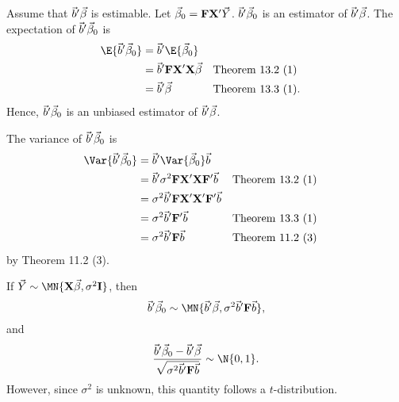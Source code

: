 \begin{Remark}{}{}
    Assume that $ \vec{b}'\vec{\beta} $ is estimable. Let
    $ \vec{\beta}_0=\mathbf{F}\mathbf{X}'\vec{Y} $.
    $ \vec{b}'\vec{\beta}_0 $ is an estimator of $ \vec{b}'\vec{\beta} $.
    \tcblower{}
    The expectation of $ \vec{b}'\vec{\beta}_0 $ is
    \begin{align*}
        \E{\Vector{b}'\Vector{\beta}_0}
         & =\Vector{b}'\E{\Vector{\beta}_0}                                                        \\
         & =\Vector{b}'\Matrix{F}\Matrix{X}'\Matrix{X}\Vector{\beta} &  & \text{Theorem 13.2 (1)}  \\
         & =\Vector{b}'\Vector{\beta}                                &  & \text{Theorem 13.3 (1)}.
    \end{align*}
    Hence, $ \vec{b}'\vec{\beta}_0 $ is an unbiased estimator of $ \vec{b}'\vec{\beta} $.

    The variance of $ \vec{b}'\vec{\beta}_0 $ is
    \begin{align*}
        \Var{\Vector{b}'\Vector{\beta}_0}
         & =\Vector{b}'\Var{\Vector{\beta}_0}\Vector{b}                                                            \\
         & =\Vector{b}'\sigma^2 \Matrix{F}\Matrix{X}'\Matrix{X}\Matrix{F}'\Vector{b}  &  & \text{Theorem 13.2 (1)} \\
         & =\sigma^2 \Vector{b}'\Matrix{F}\Matrix{X}'\Matrix{X}'\Matrix{F}'\Vector{b}                              \\
         & =\sigma^2 \Vector{b}'\Matrix{F}'\Vector{b}                                 &  & \text{Theorem 13.3 (1)} \\
         & =\sigma^2 \Vector{b}'\Matrix{F}\Vector{b}                                  &  & \text{Theorem 11.2 (3)}
    \end{align*}
    by Theorem 11.2 (3).
\end{Remark}
\begin{Theorem}{}{}
    If $ \Vector{Y} \sim \MN{\Matrix{X}\Vector{\beta},\sigma^2\Matrix{I}} $,
    then
    \[ \Vector{b}'\Vector{\beta}_0 \sim \MN{\Vector{b}'\Vector{\beta},
            \sigma^2\Vector{b}'\Matrix{F}\Vector{b}}, \]
    and
    \[ \frac{\Vector{b}'\Vector{\beta}_0-\Vector{b}'\Vector{\beta}}{\sqrt{\sigma^2\Vector{b}'\Matrix{F}\Vector{b}}}
        \sim \N{0,1}. \]
    However, since $ \sigma^2 $ is unknown, this quantity follows a $ t $-distribution.
\end{Theorem}